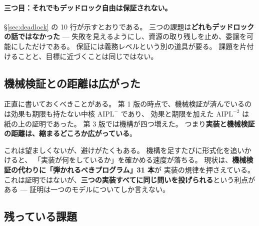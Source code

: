 \documentclass[11pt,a4paper]{ltjsarticle}
\theoremstyle{definition}
\theoremstyle{remark}
\begin{document}
\paragraph{三つ目：それでもデッドロック自由は保証されない。}
\S\ref{sec:deadlock} の 10 行が示すとおりである。
三つの課題は\textbf{どれもデッドロックの話ではなかった} ---
失敗を見えるようにし、資源の取り残しを止め、委譲を可能にしただけである。
保証には義務レベルという別の道具が要る。
課題を片付けることと、目標に近づくことは同じではない。

\subsection{機械検証との距離は広がった}

正直に書いておくべきことがある。
第 1 版の時点で、機械検証が済んでいるのは効果も期限も持たない中核 $\mathrm{AIPL}^{-}$ であり、
効果と期限を加えた $\mathrm{AIPL}^{-2}$ は紙の上の証明であった。
第 3 版では機構が四つ増えた。
つまり\textbf{実装と機械検証の距離は、縮まるどころか広がっている}。

これは望ましくないが、避けがたくもある。
機構を足すたびに形式化を追いかけると、
「実装が何をしているか」を確かめる速度が落ちる。
現状は、\textbf{機械検証の代わりに「弾かれるべきプログラム」31 本}が
実装の規律を押さえている。
これは証明ではないが、\textbf{三つの実装すべてに同じ問いを投げられる}という利点がある ---
証明は一つのモデルについてしか言えない。

\subsection{残っている課題}
\end{document}
